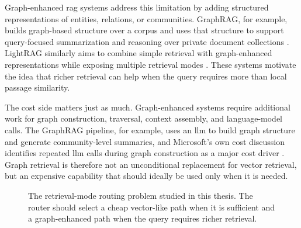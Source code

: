 \documentclass[english, bibtex]{kththesis}               %
\numberwithin{listing}{chapter}
\begin{document}
Graph-enhanced \gls{rag} systems address this limitation by adding structured representations of entities, relations, or communities. GraphRAG, for example, builds graph-based structure over a corpus and uses that structure to support query-focused summarization and reasoning over private document collections \cite{edge2024graphrag}. LightRAG similarly aims to combine simple retrieval with graph-enhanced representations while exposing multiple retrieval modes \cite{lightrag2024}. These systems motivate the idea that richer retrieval can help when the query requires more than local passage similarity.

The cost side matters just as much. Graph-enhanced systems require additional work for graph construction, traversal, context assembly, and language-model calls. The GraphRAG pipeline, for example, uses an \gls{llm} to build graph structure and generate community-level summaries, and Microsoft's own cost discussion identifies repeated \gls{llm} calls during graph construction as a major cost driver \cite{edge2024graphrag,microsoft2024graphragcosts}. Graph retrieval is therefore not an unconditional replacement for vector retrieval, but an expensive capability that should ideally be used only when it is needed.

\begin{figure}[!ht]
\centering
{}
\caption{The retrieval-mode routing problem studied in this thesis. The router should select a cheap vector-like path when it is sufficient and a graph-enhanced path when the query requires richer retrieval.}
\label{fig:retrievalModeRouting}
\end{figure}
\end{document}
